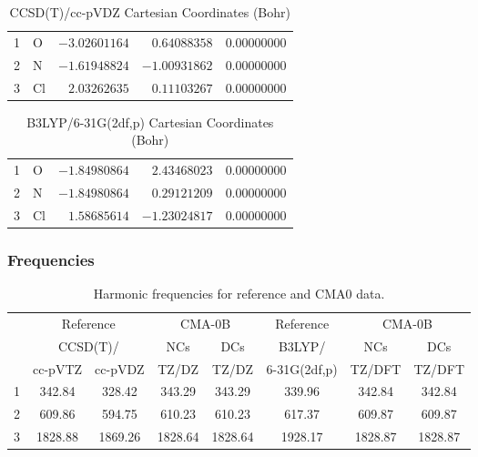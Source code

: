 \documentclass[10pt,oneside]{article}
\begin{document}
\begin{table}[h!]
\centering
\caption{CCSD(T)/cc-pVDZ Cartesian Coordinates (Bohr)}
\begin{tabular}{llrrr}
1  & O  & $-3.02601164$ & $ 0.64088358$ & $ 0.00000000$ \\
2  & N  & $-1.61948824$ & $-1.00931862$ & $ 0.00000000$ \\
3  & Cl & $ 2.03262635$ & $ 0.11103267$ & $ 0.00000000$ \\
\end{tabular}
\end{table}

\begin{table}[h!]
\centering
\caption{B3LYP/6-31G(2df,p) Cartesian Coordinates (Bohr)}
\begin{tabular}{llrrr}
1  & O  & $-1.84980864$ & $ 2.43468023$ & $ 0.00000000$ \\
2  & N  & $-1.84980864$ & $ 0.29121209$ & $ 0.00000000$ \\
3  & Cl & $ 1.58685614$ & $-1.23024817$ & $ 0.00000000$ \\
\end{tabular}
\end{table}

\clearpage

\subsubsection*{Frequencies}
\begin{table}[h!]
\centering
\caption{Harmonic frequencies for reference and CMA0 data.}
\begin{tabular}{cccccccc}
\toprule
{} & \multicolumn{2}{c}{Reference} & \multicolumn{2}{c}{CMA-0B} &    Reference & \multicolumn{2}{c}{CMA-0B} \\
{} & \multicolumn{2}{c}{CCSD(T)/} &     NCs &     DCs &       B3LYP/ &     NCs &     DCs \\
{} &   cc-pVTZ & cc-pVDZ &   TZ/DZ &   TZ/DZ & 6-31G(2df,p) &  TZ/DFT &  TZ/DFT \\
\midrule
1 &    342.84 &  328.42 &  343.29 &  343.29 &       339.96 &  342.84 &  342.84 \\
2 &    609.86 &  594.75 &  610.23 &  610.23 &       617.37 &  609.87 &  609.87 \\
3 &   1828.88 & 1869.26 & 1828.64 & 1828.64 &      1928.17 & 1828.87 & 1828.87 \\
\bottomrule
\end{tabular}
\end{table}
\end{document}
